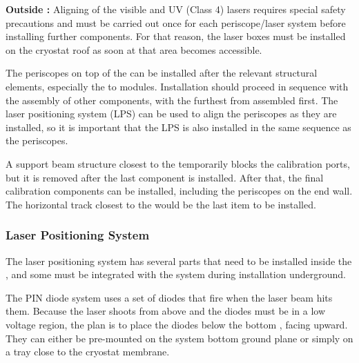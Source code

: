 {\bf Outside :}  Aligning of the visible and UV (Class 4) lasers requires special safety precautions and must be carried out once for each periscope/laser system before installing further  components. For that reason, the laser boxes must be installed on the cryostat roof as soon at that area becomes accessible. 

The periscopes on top of the  can be installed after the relevant structural elements, especially the to  modules. Installation should proceed in sequence with the assembly of other components, with the furthest from  assembled first. The laser positioning system (LPS) can be used to align the periscopes as they are installed, so it is important that the LPS is also installed in the same sequence as the periscopes. %


A support beam structure closest to the  temporarily blocks the calibration ports, but it is removed after the last  component is installed. After that, the final calibration components can be installed, including the periscopes on the  end wall. The horizontal track closest to the  would be the last item to be installed. 

\subsubsection{Laser Positioning System}
The laser positioning system has several parts that need to be installed inside the , and some must be integrated with the 
 system during installation underground. 

The PIN diode system uses a set of diodes that fire when the laser beam hits them. Because the laser shoots from above and the diodes must be in a low voltage region, the plan is to place the diodes below the bottom , facing upward. They can either be pre-mounted on the  system bottom ground plane or simply on a tray close to the cryostat membrane.

